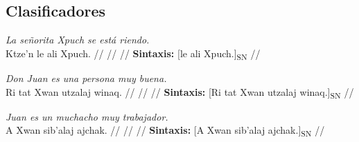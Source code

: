 \documentclass{article}%
\begin{document}
\subsection{Clasificadores}%
\label{subsec:Clasificadores}%

%
\par\medskip%
\ex
\textit{La señorita Xpuch se está riendo.} \\
\begingl
\gla Ktze'n le ali Xpuch. //
\glb  //
\glc  //
\glft \textbf{Sintaxis:} [le ali Xpuch.]\textsubscript{SN} //
\endgl
\xe
%
\medskip%
\par\medskip%
\ex
\textit{Don Juan es una persona muy buena.} \\
\begingl
\gla Ri tat Xwan utzalaj winaq. //
\glb  //
\glc  //
\glft \textbf{Sintaxis:} [Ri tat Xwan utzalaj winaq.]\textsubscript{SN} //
\endgl
\xe
%
\medskip%
\par\medskip%
\ex
\textit{Juan es un muchacho muy trabajador.} \\
\begingl
\gla A Xwan sib'alaj ajchak. //
\glb  //
\glc  //
\glft \textbf{Sintaxis:} [A Xwan sib'alaj ajchak.]\textsubscript{SN} //
\endgl
\xe
%
\medskip

%
\end{document}
